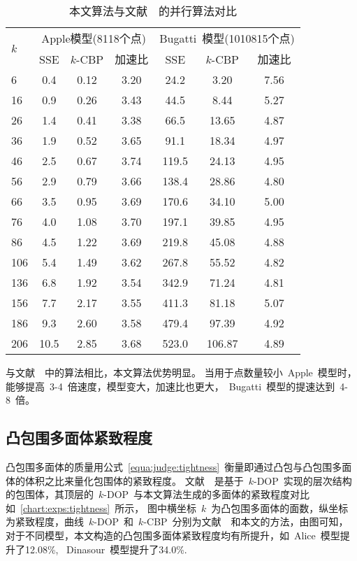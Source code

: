 \begin{table}[htbp] 
\centering
\caption{本文算法与文献~~的并行算法对比}
\begin{tabular}{p{1.5cm}<{\centering}ccc ccc} %
\toprule[1.5pt]
\multirow{2}{*}{$k$} & \multicolumn{3}{c}{Apple模型(8118个点)} &
\multicolumn{3}{c}{Bugatti~模型(1010815个点)}\\
\cmidrule(lr){2-4}\cmidrule(lr){5-7}
~&SSE\cite{karlsson2010parallel} & $k$-CBP &  加速比 & SSE & $k$-CBP &  加速比\\
\midrule[1pt]
6 & 0.4 & 0.12  & 3.20     & 24.2 & 3.20  & 7.56 \\
16 & 0.9 & 0.26  & 3.43    & 44.5 & 8.44  & 5.27 \\
26 & 1.4 & 0.41  & 3.38    & 66.5 & 13.65  & 4.87 \\
36 & 1.9 & 0.52  & 3.65    & 91.1 & 18.34  & 4.97 \\
46 & 2.5 & 0.67  & 3.74    & 119.5 & 24.13  & 4.95 \\
56 & 2.9 & 0.79  & 3.66    & 138.4 & 28.86  & 4.80 \\
66 & 3.5 & 0.95  & 3.69    & 170.6 & 34.10  & 5.00 \\
76 & 4.0 & 1.08  & 3.70    & 197.1 & 39.85  & 4.95 \\
86 & 4.5 & 1.22  & 3.69    & 219.8 & 45.08  & 4.88 \\
106 & 5.4 & 1.49  & 3.62   & 267.8 & 55.52  & 4.82 \\
136 &  6.8 & 1.92  & 3.54  & 342.9 & 71.24  & 4.81 \\
156 &  7.7 & 2.17  & 3.55  & 411.3 & 81.18  & 5.07 \\
186 &  9.3 & 2.60  & 3.58  & 479.4 & 97.39  & 4.92 \\
206 &  10.5 & 2.85  & 3.68 & 523.0 & 106.87  & 4.89  \\  
\bottomrule[1.5pt]
\end{tabular}
\label{tab:exp:sse-time}
\end{table}

与文献~~中的算法相比，本文算法优势明显。
当用于点数量较小~Apple~模型时，能够提高~3-4~倍速度，模型变大，加速比也更大，~Bugatti~模型的提速达到~4-8~倍。

\subsection{凸包围多面体紧致程度}
\label{subsec:exper:tightness}

凸包围多面体的质量用公式~\ref{equa:judge:tightness}~衡量即通过凸包与凸包围多面体的体积之比来量化包围体的紧致程度。
文献~~是基于~$k$-DOP~实现的层次结构的包围体，其顶层的~$k$-DOP~与本文算法生成的多面体的紧致程度对比如~\ref{chart:exps:tightness}~所示，
图中横坐标~$k$~为凸包围多面体的面数，纵坐标为紧致程度，曲线~$k$-DOP~和~$k$-CBP~分别为文献~~和本文的方法，由图可知，
对于不同模型，本文构造的凸包围多面体紧致程度均有所提升，如~Alice~模型提升了12.08\%, ~Dinasour~模型提升了34.0\%.

